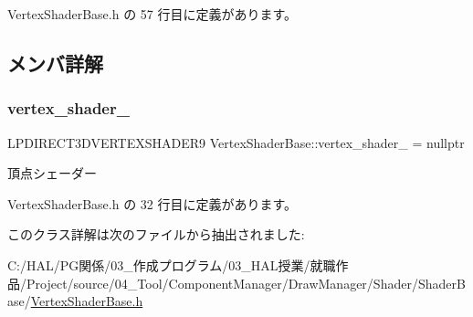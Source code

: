  Vertex\+Shader\+Base.\+h の 57 行目に定義があります。



\subsection{メンバ詳解}
\mbox{\label{class_vertex_shader_base_a06f34810bedce79d6115c88a61dfbea4}} 
\subsubsection{\texorpdfstring{vertex\+\_\+shader\+\_\+}{vertex\_shader\_}}
{\footnotesize\ttfamily L\+P\+D\+I\+R\+E\+C\+T3\+D\+V\+E\+R\+T\+E\+X\+S\+H\+A\+D\+E\+R9 Vertex\+Shader\+Base\+::vertex\+\_\+shader\+\_\+ = nullptr\hspace{0.3cm}{\ttfamily [private]}}



頂点シェーダー 



 Vertex\+Shader\+Base.\+h の 32 行目に定義があります。



このクラス詳解は次のファイルから抽出されました\+:\begin{DoxyCompactItemize}
\item 
C\+:/\+H\+A\+L/\+P\+G関係/03\+\_\+作成プログラム/03\+\_\+\+H\+A\+L授業/就職作品/\+Project/source/04\+\_\+\+Tool/\+Component\+Manager/\+Draw\+Manager/\+Shader/\+Shader\+Base/\mbox{\hyperlink{_vertex_shader_base_8h}{Vertex\+Shader\+Base.\+h}}\end{DoxyCompactItemize}
